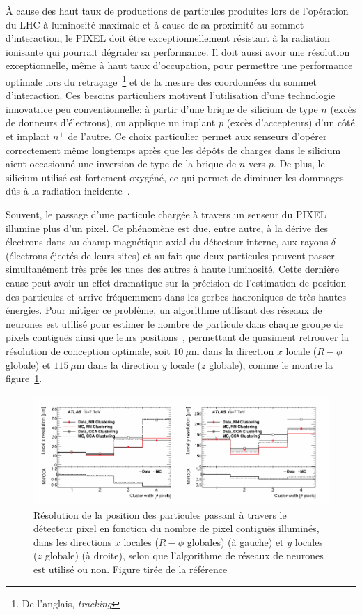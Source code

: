 À cause des haut taux de productions de particules produites lors de
l'opération du LHC à luminosité maximale et à cause de sa proximité au
sommet d'interaction, le PIXEL doit être exceptionnellement résistant
à la radiation ionisante qui pourrait dégrader sa performance. Il doit
aussi avoir une résolution exceptionnelle, même à haut taux
d'occupation, pour permettre une performance optimale lors du
retraçage~\footnote{De l'anglais, \emph{tracking}} et de la mesure des
coordonnées du sommet d'interaction. Ces besoins particuliers motivent
l'utilisation d'une technologie innovatrice peu conventionnelle: à
partir d'une brique de silicium de type $n$ (excès de donneurs
d'électrons), on applique un implant $p$ (excès d'accepteurs) d'un
côté et implant $n^+$ de l'autre. Ce choix particulier permet aux
senseurs d'opérer correctement même longtemps après que les dépôts de
charges dans le silicium aient occasionné une inversion de type de la
brique de $n$ vers $p$. De plus, le silicium utilisé est fortement
oxygéné, ce qui permet de diminuer les dommages dûs à la radiation
incidente~\cite{collaboration_atlas_2008}.

Souvent, le passage d'une particule chargée à travers un senseur du
PIXEL illumine plus d'un pixel. Ce phénomène est due, entre autre, à
la dérive des électrons dans au champ magnétique axial du détecteur
interne, aux rayons-$\delta$ (électrons éjectés de leurs sites) et au
fait que deux particules peuvent passer simultanément très près les
unes des autres à haute luminosité. Cette dernière cause peut avoir un
effet dramatique sur la précision de l'estimation de position des
particules et arrive fréquemment dans les gerbes hadroniques de très
hautes énergies. Pour mitiger ce problème, un algorithme utilisant des
réseaux de neurones est utilisé pour estimer le nombre de particule
dans chaque groupe de pixels contiguës ainsi que leurs
positions~\cite{collaboration_neural_2014}, permettant de quasiment
retrouver la résolution de conception optimale, soit $10~\mu$m dans la direction $x$ locale ($R-\phi$ globale)
et $115~\mu$m dans la direction $y$ locale ($z$ globale), comme le montre la figure~\ref{fig:pixel_acc}.

\begin{figure}
  \centering
  \includegraphics{pixel_acc.pdf}
  \caption{Résolution de la position des particules passant à travers
    le détecteur pixel en fonction du nombre de pixel contiguës
    illuminés, dans les directions $x$ locales ($R-\phi$ globales) (à
    gauche) et $y$ locales ($z$ globale) (à droite), selon que
    l'algorithme de réseaux de neurones est utilisé ou non. Figure
    tirée de la référence~\cite{collaboration_neural_2014}}
  \label{fig:pixel_acc}
\end{figure}

